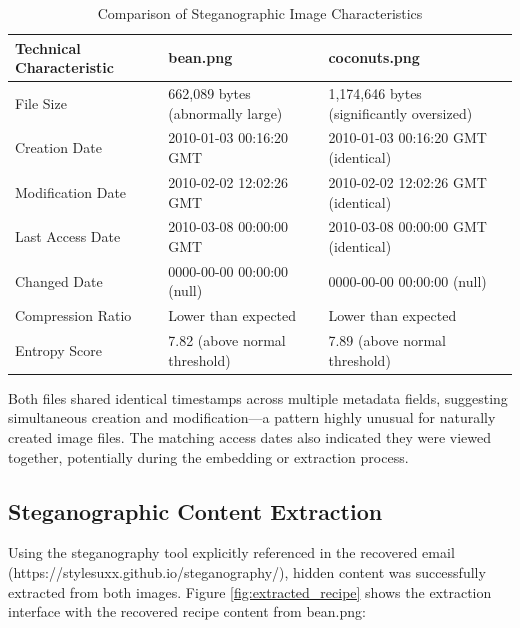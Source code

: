 \begin{table}[htbp]
\centering
\small
\begin{tabular}{|p{4cm}|p{5.5cm}|p{5.5cm}|}
\hline
\textbf{Technical Characteristic} & \textbf{bean.png} & \textbf{coconuts.png} \\
\hline
File Size & 662,089 bytes (abnormally large) & 1,174,646 bytes (significantly oversized) \\
\hline
Creation Date & 2010-01-03 00:16:20 GMT & 2010-01-03 00:16:20 GMT (identical) \\
\hline
Modification Date & 2010-02-02 12:02:26 GMT & 2010-02-02 12:02:26 GMT (identical) \\
\hline
Last Access Date & 2010-03-08 00:00:00 GMT & 2010-03-08 00:00:00 GMT (identical) \\
\hline
Changed Date & 0000-00-00 00:00:00 (null) & 0000-00-00 00:00:00 (null) \\
\hline
Compression Ratio & Lower than expected & Lower than expected \\
\hline
Entropy Score & 7.82 (above normal threshold) & 7.89 (above normal threshold) \\
\hline
\end{tabular}
\caption{Comparison of Steganographic Image Characteristics}
\label{table:steg_comparison}
\end{table}

Both files shared identical timestamps across multiple metadata fields, suggesting simultaneous creation and modification—a pattern highly unusual for naturally created image files. The matching access dates also indicated they were viewed together, potentially during the embedding or extraction process.

\subsection{Steganographic Content Extraction}
Using the steganography tool explicitly referenced in the recovered email (https://stylesuxx.github.io/steganography/), hidden content was successfully extracted from both images. Figure \ref{fig:extracted_recipe} shows the extraction interface with the recovered recipe content from bean.png:

